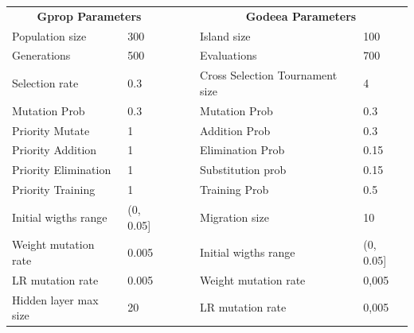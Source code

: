 \begin{table}[h!]
\centering
\begin{tabular}{llll|l|l|}
\cline{1-2} \cline{5-6}
\multicolumn{2}{|c|}{\textbf{Gprop Parameters}}                              &  &  & \multicolumn{2}{c|}{\textbf{Godeea Parameters}} \\ \cline{1-2} \cline{5-6} 
\multicolumn{1}{|l|}{Population size}       & \multicolumn{1}{l|}{300}       &  &  & Island size                       & 100         \\ \cline{1-2} \cline{5-6} 
\multicolumn{1}{|l|}{Generations}           & \multicolumn{1}{l|}{500}       &  &  & Evaluations                       & 700         \\ \cline{1-2} \cline{5-6} 
\multicolumn{1}{|l|}{Selection rate}        & \multicolumn{1}{l|}{0.3}       &  &  & Cross Selection Tournament size   & 4           \\ \cline{1-2} \cline{5-6} 
\multicolumn{1}{|l|}{Mutation Prob}         & \multicolumn{1}{l|}{0.3}       &  &  & Mutation Prob                     & 0.3         \\ \cline{1-2} \cline{5-6} 
\multicolumn{1}{|l|}{Priority Mutate}       & \multicolumn{1}{l|}{1}         &  &  & Addition Prob                     & 0.3         \\ \cline{1-2} \cline{5-6} 
\multicolumn{1}{|l|}{Priority Addition}     & \multicolumn{1}{l|}{1}         &  &  & Elimination Prob                  & 0.15        \\ \cline{1-2} \cline{5-6} 
\multicolumn{1}{|l|}{Priority Elimination}  & \multicolumn{1}{l|}{1}         &  &  & Substitution prob                 & 0.15        \\ \cline{1-2} \cline{5-6} 
\multicolumn{1}{|l|}{Priority Training}     & \multicolumn{1}{l|}{1}         &  &  & Training Prob                     & 0.5         \\ \cline{1-2} \cline{5-6} 
\multicolumn{1}{|l|}{Initial wigths range}  & \multicolumn{1}{l|}{(0, 0.05]} &  &  & Migration size                    & 10          \\ \cline{1-2} \cline{5-6} 
\multicolumn{1}{|l|}{Weight mutation rate}  & \multicolumn{1}{l|}{0.005}     &  &  & Initial wigths range              & (0, 0.05]   \\ \cline{1-2} \cline{5-6} 
\multicolumn{1}{|l|}{LR mutation rate}      & \multicolumn{1}{l|}{0.005}     &  &  & Weight mutation rate              & 0,005       \\ \cline{1-2} \cline{5-6} 
\multicolumn{1}{|l|}{Hidden layer max size} & \multicolumn{1}{l|}{20}        &  &  & LR mutation rate                  & 0,005       \\ \cline{1-2} \cline{5-6} 

\end{tabular}
\end{table}

